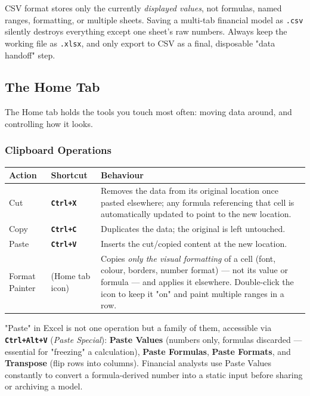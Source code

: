 \documentclass[11pt,a4paper]{article}
\newcommand{\key}[1]{\texttt{\colorbox{black!8}{\textbf{#1}}}}
\begin{document}
\begin{pitfall}
CSV format stores only the currently \emph{displayed values}, not formulas, named ranges, formatting, or multiple sheets. Saving a multi-tab financial model as \texttt{.csv} silently destroys everything except one sheet's raw numbers. Always keep the working file as \texttt{.xlsx}, and only export to CSV as a final, disposable "data handoff" step.
\end{pitfall}

\subsection{The Home Tab}

The Home tab holds the tools you touch most often: moving data around, and controlling how it looks.

\subsubsection{Clipboard Operations}

\begin{center}
\begin{tabular}{@{}p{2.6cm}p{2.4cm}p{6.6cm}@{}}
\toprule
\textbf{Action} & \textbf{Shortcut} & \textbf{Behaviour} \\
\midrule
Cut & \key{Ctrl+X} & Removes the data from its original location once pasted elsewhere; any formula referencing that cell is automatically updated to point to the new location. \\
Copy & \key{Ctrl+C} & Duplicates the data; the original is left untouched. \\
Paste & \key{Ctrl+V} & Inserts the cut/copied content at the new location. \\
Format Painter & (Home tab icon) & Copies \emph{only the visual formatting} of a cell (font, colour, borders, number format) --- not its value or formula --- and applies it elsewhere. Double-click the icon to keep it "on" and paint multiple ranges in a row. \\
\bottomrule
\end{tabular}
\end{center}

\begin{keyconcept}
"Paste" in Excel is not one operation but a family of them, accessible via \key{Ctrl+Alt+V} (\textit{Paste Special}): \textbf{Paste Values} (numbers only, formulas discarded --- essential for "freezing" a calculation), \textbf{Paste Formulas}, \textbf{Paste Formats}, and \textbf{Transpose} (flip rows into columns). Financial analysts use Paste Values constantly to convert a formula-derived number into a static input before sharing or archiving a model.
\end{keyconcept}
\end{document}
